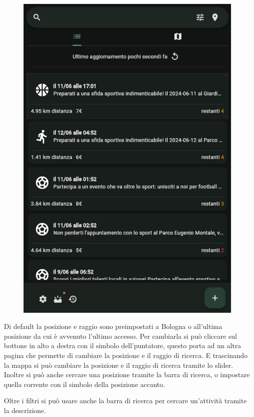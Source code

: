 \documentclass[a4paper,12pt]{article}
\begin{document}
\begin{figure}[h]
\begin{minipage}{0.32\textwidth}
        \includegraphics[width=1\linewidth]{img/Search.png}
    \end{minipage}
\end{figure}

Di default la posizione e raggio sono preimpostati a Bologna o all'ultima posizione da cui è avvenuto l'ultimo accesso.
Per cambiarla si può cliccare sul bottone in alto a destra con il simbolo dell'puntatore, questo porta ad un altra pagina che permette di cambiare la posizione e il raggio di ricerca.
E trascinando la mappa si può cambiare la posizione e il raggio di ricerca tramite lo slider.
Inoltre si può anche cercare una posizione tramite la barra di ricerca, o impostare quella corrente con il simbolo della posizione accanto.

Oltre i filtri si può usare anche la barra di ricerca per cercare un'attività tramite la descrizione.
\end{document}
